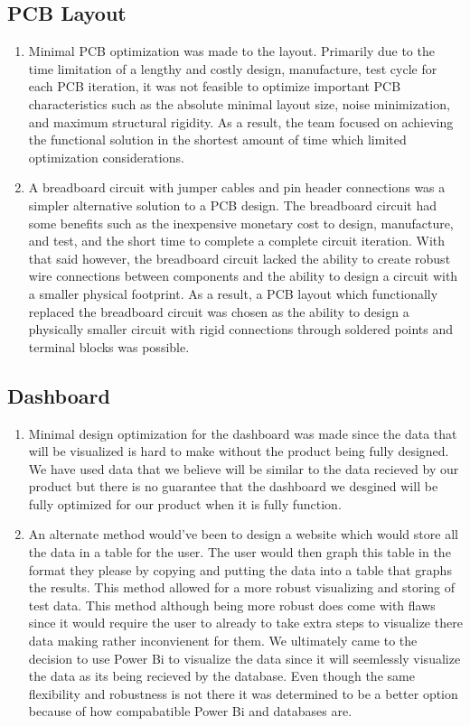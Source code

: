\documentclass[12pt, titlepage]{article}
\begin{document}
\subsection{PCB Layout}
\begin{enumerate}
  \item Minimal PCB optimization was made to the layout. Primarily due to the time limitation of a lengthy and costly design, manufacture, test cycle for each PCB iteration, it was not feasible to optimize important PCB characteristics such as the absolute minimal layout size, noise minimization, and maximum structural rigidity. As a result, the team focused on achieving the functional solution in the shortest amount of time which limited optimization considerations.
  \item A breadboard circuit with jumper cables and pin header connections was a simpler alternative solution to a PCB design. The breadboard circuit had some benefits such as the inexpensive monetary cost to design, manufacture, and test, and the short time to complete a complete circuit iteration. With that said however, the breadboard circuit lacked the ability to create robust wire connections between components and the ability to design a circuit with a smaller physical footprint. As a result, a PCB layout which functionally replaced the breadboard circuit was chosen as the ability to design a physically smaller circuit with rigid connections through soldered points and terminal blocks was possible.
\end{enumerate}

\subsection{Dashboard}
\begin{enumerate}
  \item Minimal design optimization for the dashboard was made since the data that will be visualized is hard to make without the product being fully designed. We have used data that we believe will be similar to the data recieved by our product but there is no guarantee that the dashboard we desgined will be fully optimized for our product when it is fully function. 
  \item An alternate method would've been to design a website which would store all the data in a table for the user. The user would then graph this table in the format they please by copying and putting the data into a table that graphs the results. This method allowed for a more robust visualizing and storing of test data. This method although being more robust does come with flaws since it would require the user to already to take extra steps to visualize there data making rather inconvienent for them. We ultimately came to the decision to use Power Bi to visualize the data since it will seemlessly visualize the data as its being recieved by the database. Even though the same flexibility and robustness is not there it was determined to be a better option because of how compabatible Power Bi and databases are.
\end{enumerate}
\end{document}
